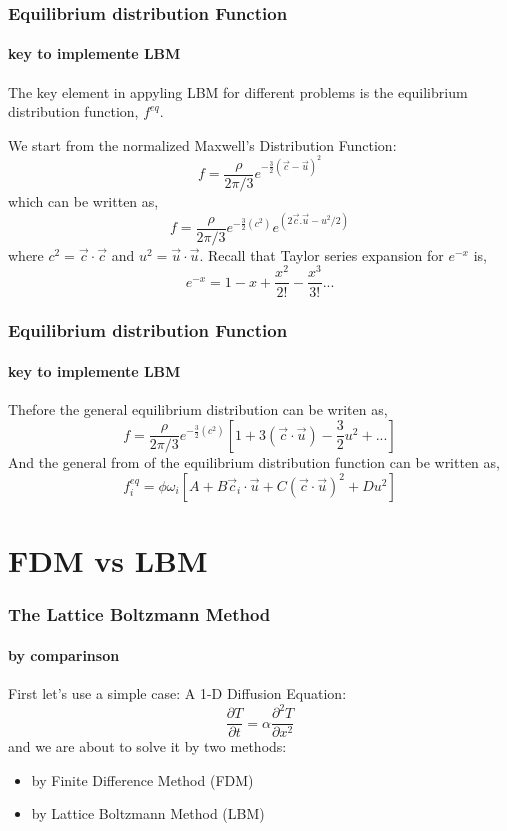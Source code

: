 \documentclass[12pt]{beamer}
\begin{document}
\begin{frame}
  \frametitle{Equilibrium distribution Function}
  \framesubtitle{key to implemente LBM}

The key element in appyling LBM for different problems is the equilibrium distribution function, $f^{eq}$. 

We start from the normalized Maxwell's Distribution Function:
  \begin{equation}
   f = \frac{\rho}{2\pi/3} e^{-\frac{3}{2}(\vec{c}-\vec{u})^2} 
  \end{equation}
which can be written as,
  \begin{equation}
   f = \frac{\rho}{2\pi/3} e^{-\frac{3}{2}(c^2)}e^{(2\vec{c}.\vec{u} - u^2/2)}
  \end{equation}
where $ c^2 = \vec{c} \cdot \vec{c} $ and $ u^2 = \vec{u} \cdot \vec{u} $.
Recall that Taylor series expansion for $ e^{-x} $ is,
  \begin{equation}
   e^{-x} = 1 - x + \frac{x^2}{2!} - \frac{x^3}{3!} ...
  \end{equation}
\end{frame}

\begin{frame}
  \frametitle{Equilibrium distribution Function}
  \framesubtitle{key to implemente LBM}

Thefore the general equilibrium distribution can be writen as,
  \begin{equation}
   f = \frac{\rho}{2\pi/3} e^{-\frac{3}{2}(c^2)}[1+3(\vec{c} \cdot \vec{u})-\frac{3}{2} u^2 +...]
  \end{equation}
And the general from of the equilibrium distribution function can be written as,
  \begin{equation}
   f_i^{eq}=\phi\omega_i[A + B\vec{c}_i\cdot\vec{u}+ C(\vec{c}\cdot\vec{u})^2+ Du^2]
  \end{equation}
\end{frame}

\section{FDM vs LBM}

\begin{frame}
  \frametitle{The Lattice Boltzmann Method}
  \framesubtitle{by comparinson}
First let's use a simple case: A 1-D Diffusion Equation:
  \begin{equation}
   \frac{\partial T}{\partial t} = \alpha\frac{\partial^2 T}{\partial x^2}
  \end{equation}
and we are about to solve it by two methods:
  \begin{itemize}
    \item by Finite Difference Method (FDM)
    \item by Lattice Boltzmann Method (LBM)
  \end{itemize}
\end{frame}
\end{document}
